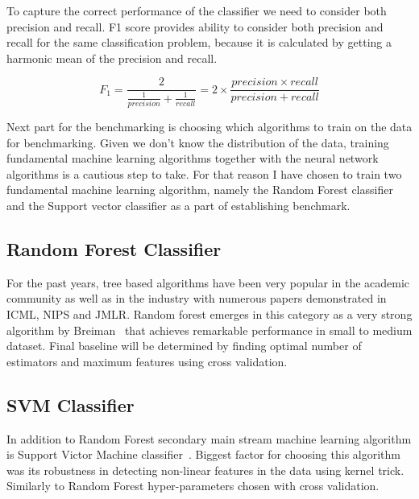 To capture the correct performance of the classifier we need to consider both precision and recall.
F1 score provides ability to consider both precision and recall for the same classification problem, because it is calculated by getting a harmonic mean of the precision and recall.

\begin{equation}
    F_1 = \frac{2}{\frac{1}{precision} + \frac{1}{recall}} = 2 \times \frac{precision \times recall}{precision + recall}
\end{equation}


Next part for the benchmarking is choosing which algorithms to train on the data for benchmarking.
Given we don't know the distribution of the data, training fundamental machine learning algorithms together with the neural network algorithms is a cautious step to take. 
For that reason I have chosen to train two fundamental machine learning algorithm, namely the Random Forest classifier and the Support vector classifier as a part of establishing benchmark.


\subsection{Random Forest Classifier}
For the past years, tree based algorithms have been very popular in the academic community as well as in the industry with numerous papers demonstrated in ICML, NIPS and JMLR.
Random forest emerges in this category as a very strong algorithm by Breiman~\cite{randomforest} that achieves remarkable performance in small to medium dataset.
Final baseline will be determined by finding optimal number of estimators and maximum features using cross validation.


\subsection{SVM Classifier}
In addition to Random Forest secondary main stream machine learning algorithm is Support Victor Machine classifier~\cite{svm}.
Biggest factor for choosing this algorithm was its robustness in detecting non-linear features in the data using kernel trick.
Similarly to Random Forest hyper-parameters chosen with cross validation.

